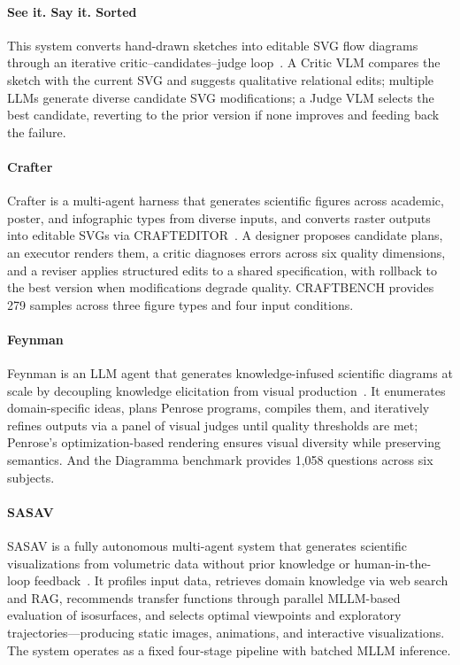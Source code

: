 \paragraph{See it. Say it. Sorted}
This system converts hand-drawn sketches into editable SVG flow diagrams through an iterative critic–candidates–judge loop~\cite{avg250815222}. A Critic VLM compares the sketch with the current SVG and suggests qualitative relational edits; multiple LLMs generate diverse candidate SVG modifications; a Judge VLM selects the best candidate, reverting to the prior version if none improves and feeding back the failure.

\paragraph{Crafter}
Crafter is a multi-agent harness that generates scientific figures across academic, poster, and infographic types from diverse inputs, and converts raster outputs into editable SVGs via CRAFTEDITOR~\cite{avg260530611}. A designer proposes candidate plans, an executor renders them, a critic diagnoses errors across six quality dimensions, and a reviser applies structured edits to a shared specification, with rollback to the best version when modifications degrade quality. CRAFTBENCH provides 279 samples across three figure types and four input conditions.

\paragraph{Feynman}
Feynman is an LLM agent that generates knowledge-infused scientific diagrams at scale by decoupling knowledge elicitation from visual production~\cite{avg260312597}. It enumerates domain-specific ideas, plans Penrose programs, compiles them, and iteratively refines outputs via a panel of visual judges until quality thresholds are met; Penrose's optimization-based rendering ensures visual diversity while preserving semantics. And the Diagramma benchmark provides 1,058 questions across six subjects.

\paragraph{SASAV}
SASAV is a fully autonomous multi-agent system that generates scientific visualizations from volumetric data without prior knowledge or human-in-the-loop feedback~\cite{avg260403406}. It profiles input data, retrieves domain knowledge via web search and RAG, recommends transfer functions through parallel MLLM-based evaluation of isosurfaces, and selects optimal viewpoints and exploratory trajectories—producing static images, animations, and interactive visualizations. The system operates as a fixed four-stage pipeline with batched MLLM inference.  

